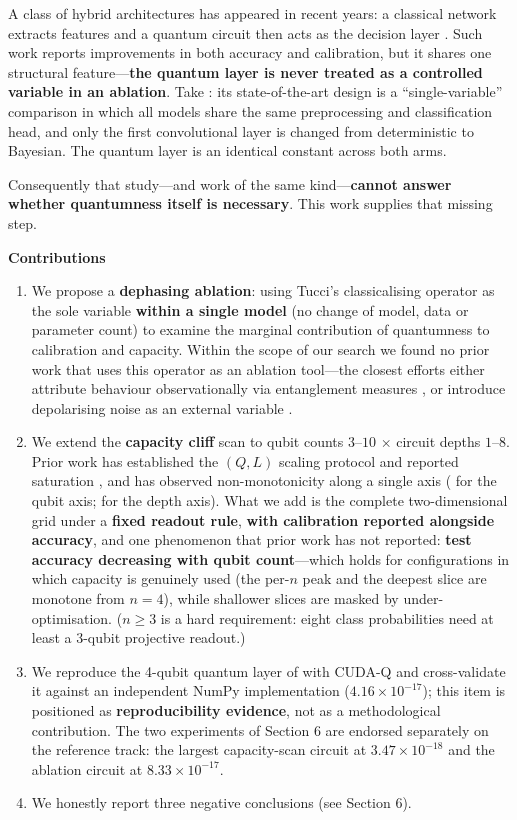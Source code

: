 \documentclass{article}
\begin{document}
A class of hybrid architectures has appeared in recent years: a
classical network extracts features and a quantum circuit then acts as
the decision layer \cite{wang2026}. Such work reports improvements in
both accuracy and calibration, but it shares one structural
feature---\textbf{the quantum layer is never treated as a controlled
variable in an ablation}. Take \cite{wang2026}: its state-of-the-art
design is a ``single-variable'' comparison in which all models share the
same preprocessing and classification head, and only the first
convolutional layer is changed from deterministic to Bayesian. The
quantum layer is an identical constant across both arms.

Consequently that study---and work of the same kind---\textbf{cannot
answer whether quantumness itself is necessary}. This work supplies that
missing step.

\textbf{Contributions}

\begin{enumerate}
\item
  We propose a \textbf{dephasing ablation}: using Tucci's classicalising
  operator \cite{tucci2012} as the sole variable \textbf{within a single
  model} (no change of model, data or parameter count) to examine the
  marginal contribution of quantumness to calibration and capacity.
  Within the scope of our search we found no prior work that uses this
  operator as an ablation tool---the closest efforts either attribute
  behaviour observationally via entanglement measures
  \cite{nausheen2026}, or introduce depolarising noise as an external
  variable \cite{ghosh2026}.
\item
  We extend the \textbf{capacity cliff} scan to qubit counts
  \(3\)--\(10\) \(\times\) circuit depths \(1\)--\(8\). Prior work has
  established the \((Q,L)\) scaling protocol and reported saturation
  \cite{vyskubov2026}, and has observed non-monotonicity along a single
  axis (\cite{le2025} for the qubit axis; \cite{zhang2021suppression} for
  the depth axis). What we add is the complete two-dimensional grid
  under a \textbf{fixed readout rule}, \textbf{with calibration reported
  alongside accuracy}, and one phenomenon that prior work has not
  reported: \textbf{test accuracy decreasing with qubit count}---which
  holds for configurations in which capacity is genuinely used (the
  per-\(n\) peak and the deepest slice are monotone from \(n = 4\)),
  while shallower slices are masked by under-optimisation. (\(n \geq 3\)
  is a hard requirement: eight class probabilities need at least a
  3-qubit projective readout.)
\item
  We reproduce the 4-qubit quantum layer of \cite{wang2026} with CUDA-Q
  and cross-validate it against an independent NumPy implementation
  (\(4.16 \times 10^{- 17}\)); this item is positioned as
  \textbf{reproducibility evidence}, not as a methodological
  contribution. The two experiments of Section 6 are endorsed separately
  on the reference track: the largest capacity-scan circuit at
  \(3.47 \times 10^{- 18}\) and the ablation circuit at
  \(8.33 \times 10^{- 17}\).
\item
  We honestly report three negative conclusions (see Section 6).
\end{enumerate}
\end{document}
